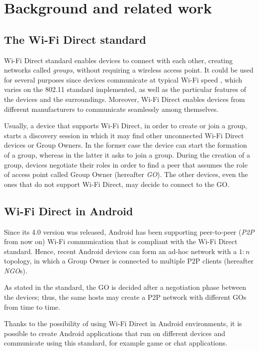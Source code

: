 \section{Background and related work} %
\subsection{The Wi-Fi Direct standard}
Wi-Fi Direct standard enables devices to connect with each other, creating 
networks called \textit{groups}, without requiring a wireless access point. It
could be used for several purposes since devices communicate at typical Wi-Fi
speed \cite{bib:wifiP2pspec}, which varies on the 802.11 standard implemented,
as well as the particular features of the devices and the surroundings.
Moreover, Wi-Fi Direct enables devices from different manufacturers to
communicate seamlessly among themselves.

Usually, a device that supports Wi-Fi Direct, in order to create or join a
group, starts a discovery session in which it may find other unconnected Wi-Fi
Direct devices or Group Owners.
In the former case the device can start the formation of a group, whereas in
the latter it asks to join a group.
During the creation of a group,
devices negotiate their roles in order to find a peer that assumes the role of 
access point called Group Owner (hereafter \textit{GO}). The other devices,
even the ones that do not support Wi-Fi Direct, may decide to connect to the
GO.

\subsection{Wi-Fi Direct in Android}
Since its 4.0 version was released, Android has been supporting peer-to-peer 
(\textit{P2P} from now on) Wi-Fi communication that is compliant with the 
Wi-Fi Direct standard\cite{bib:wifiP2pspec}. 
Hence, recent Android devices can form an ad-hoc network with a $1:n$ topology,
in which a Group Owner is connected to multiple P2P clients (hereafter \textit{NGO}s).

As stated in the standard, the GO is decided after a negotiation phase between
the devices; thus, the same hosts may create a P2P network with different GOs
from time to time.

Thanks to the possibility of using Wi-Fi Direct in Android environments, it is
possible to create Android applications that run on different devices and
communicate using this standard, for example game or chat applications.

